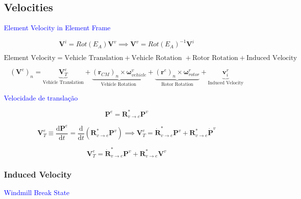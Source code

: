 \subsection{Velocities}

\textcolor{blue}{Element Velocity in  Element Frame}

\begin{equation}
    \mathbf{V}^i = Rot(E_A)  \mathbf{V}^v \implies \mathbf{V}^v = Rot(E_A)^{-1} \mathbf{V}^i
\end{equation}

$$
    \text{Element Velocity} = \text{Vehicle Translation} + \text{Vehicle Rotation } + \text{Rotor Rotation} + \text{Induced Velocity}
$$


\begin{equation}
    \left( \mathbf{V}^e \right)_n =  \underbrace{\boldsymbol{V}^e_T}_\text{Vehicle Translation} + \underbrace{\left(\mathbf{r}_{CM}\right)_n \times \boldsymbol{\omega}^v_{vehicle}}_\text{Vehicle Rotation } + \underbrace{\left(\mathbf{r}^e\right)_n \times \boldsymbol{\omega}^r_{rotor}}_\text{Rotor Rotation} + \underbrace{\boldsymbol{v}_{i}^r}_\text{Induced Velocity}
\end{equation}


\textcolor{blue}{Velocidade de translação}



\begin{equation}
    \mathbf{P}^e =  \boldsymbol{R}^*_{v \rightarrow e} \mathbf{P}^v 
\end{equation}

\begin{equation}
    \mathbf{V}^e_T \equiv \frac{\mathrm{d}\mathbf{P}^e}{\mathrm{d}t} =  \frac{\mathrm{d}}{\mathrm{d}t} \left(\boldsymbol{R}^*_{v \rightarrow e} \mathbf{P}^v \right) \implies  \mathbf{V}^e_T = \boldsymbol{\dot{R}}^*_{v \rightarrow e} \mathbf{P}^v + \boldsymbol{R}^*_{v \rightarrow e} \dot{\mathbf{P}}^v
\end{equation}

\begin{equation}
    \mathbf{V}^e_T = \dot{\boldsymbol{R}}^*_{v \rightarrow e} \mathbf{P}^v + \boldsymbol{R}^*_{v \rightarrow e} \mathbf{V}^v
\end{equation}

\subsubsection{Induced Velocity}

\textcolor{blue}{Windmill Break State}

